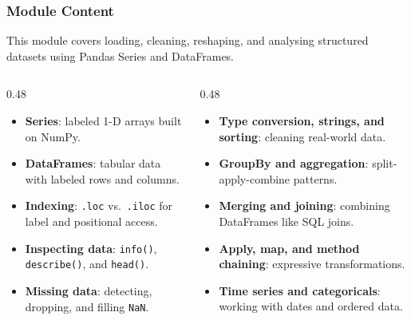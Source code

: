 \documentclass[aspectratio=169,10pt]{beamer}
\newcommand{\keyword}[1]{\textcolor{PrimaryBlue}{\textbf{#1}}}
\newcommand{\codeword}[1]{\texttt{#1}}
\begin{document}
\begin{frame}
\frametitle{Module Content}
\small
This module covers loading, cleaning, reshaping, and analysing structured datasets using Pandas Series and DataFrames.

\vspace{0.16cm}
\begin{columns}[T,totalwidth=0.96\textwidth]
\begin{column}{0.48\textwidth}
\begin{itemize}\setlength\itemsep{0.08cm}
  \item \keyword{Series}: labeled 1-D arrays built on NumPy.
  \item \keyword{DataFrames}: tabular data with labeled rows and columns.
  \item \keyword{Indexing}: \codeword{.loc} vs.\ \codeword{.iloc} for label and positional access.
  \item \keyword{Inspecting data}: \codeword{info()}, \codeword{describe()}, and \codeword{head()}.
  \item \keyword{Missing data}: detecting, dropping, and filling \codeword{NaN}.
\end{itemize}
\end{column}
\begin{column}{0.48\textwidth}
\begin{itemize}\setlength\itemsep{0.08cm}
  \item \keyword{Type conversion, strings, and sorting}: cleaning real-world data.
  \item \keyword{GroupBy and aggregation}: split-apply-combine patterns.
  \item \keyword{Merging and joining}: combining DataFrames like SQL joins.
  \item \keyword{Apply, map, and method chaining}: expressive transformations.
  \item \keyword{Time series and categoricals}: working with dates and ordered data.
\end{itemize}
\end{column}
\end{columns}
\end{frame}
\end{document}
